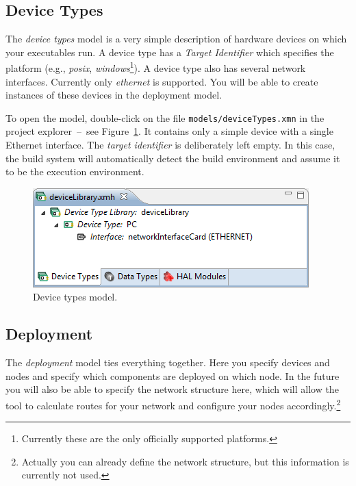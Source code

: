 \subsection{Device Types}

The \emph{device types} model is a very simple description of hardware devices on which your \xme executables run.
A device type has a \emph{Target Identifier} which specifies the platform (e.g., \emph{posix}, \emph{windows}\footnote{%
	Currently these are the only officially supported platforms.
}).
A device type also has several network interfaces. Currently only \emph{ethernet} is supported.
You will be able to create instances of these devices in the deployment model.

To open the model, double-click on the file \verb|models/deviceTypes.xmn| in the project explorer~--~see Figure~\ref{fig:xmt_deviceTypes.png}.
It contains only a simple device with a single Ethernet interface.
The \emph{target identifier} is deliberately left empty.
In this case, the \xme build system will automatically detect the build environment and assume it to be the execution environment.

\begin{figure}[htpb]
	\centering
	\includegraphics[scale=0.75]{figures/xmt_deviceTypes.png}
	\caption{Device types model.}
	\label{fig:xmt_deviceTypes.png}
\end{figure}

\subsection{Deployment}

The \emph{deployment} model ties everything together.
Here you specify devices and nodes and specify which components are deployed on which node.
In the future you will also be able to specify the network structure here,
which will allow the tool to calculate routes for your network and configure your nodes accordingly.\footnote{%
	Actually you can already define the network structure, but this information is currently not used.
}

